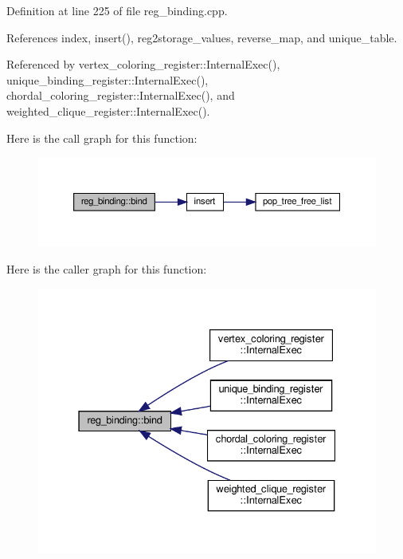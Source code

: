Definition at line 225 of file reg\+\_\+binding.\+cpp.



References index, insert(), reg2storage\+\_\+values, reverse\+\_\+map, and unique\+\_\+table.



Referenced by vertex\+\_\+coloring\+\_\+register\+::\+Internal\+Exec(), unique\+\_\+binding\+\_\+register\+::\+Internal\+Exec(), chordal\+\_\+coloring\+\_\+register\+::\+Internal\+Exec(), and weighted\+\_\+clique\+\_\+register\+::\+Internal\+Exec().

Here is the call graph for this function\+:
\nopagebreak
\begin{figure}[H]
\begin{center}
\leavevmode
\includegraphics[width=350pt]{da/d7c/classreg__binding_ac9d0eb07575596333db08cda5257c1b6_cgraph}
\end{center}
\end{figure}
Here is the caller graph for this function\+:
\nopagebreak
\begin{figure}[H]
\begin{center}
\leavevmode
\includegraphics[width=331pt]{da/d7c/classreg__binding_ac9d0eb07575596333db08cda5257c1b6_icgraph}
\end{center}
\end{figure}
\mbox{\label{classreg__binding_ae3ecd3a0314a97830ad0acd2568547c2}} 
